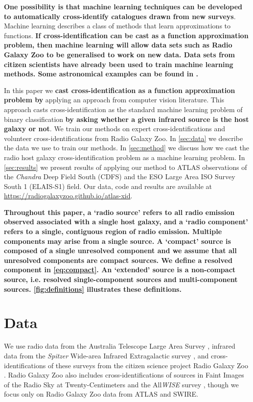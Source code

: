 \documentclass[fleqn,usenatbib,usedcolumn]{mnras}
\newcommand{\edited}[1]{{\bf {#1}}}
\begin{document}
  \edited{One possibility is that machine learning techniques can
  be developed to automatically cross-identify catalogues drawn from new surveys}. Machine learning
  describes a class of methods that learn approximations to functions. \edited{If
  cross-identification can be cast as a function approximation problem, then machine learning will allow data
  sets such as Radio Galaxy Zoo to be generalised to work on new data. Data sets from
  citizen scientists have already been used to train machine learning methods.
  Some astronomical examples can be found in \citet{marshall15citizenscience}.}

  In this paper we \edited{cast cross-identification as a function
  approximation problem by} applying an approach from computer vision
  literature. This approach casts cross-identification as the standard machine
  learning problem of binary classification \edited{by asking whether a given
  infrared source is the host galaxy or not}. We train our methods on expert
  cross-identifications and volunteer cross-identifications from Radio Galaxy Zoo. In
  \autoref{sec:data} we describe the data we use to train our methods. In
  \autoref{sec:method} we discuss how we cast the radio host galaxy
  cross-identification problem as a machine learning problem. In
  \autoref{sec:results} we present results of applying our method to ATLAS
  observations of the \emph{Chandra} Deep Field South (CDFS) and the ESO Large Area ISO Survey South 1 (ELAIS-S1) field. Our data, code and results are
  available at \url{https://radiogalaxyzoo.github.io/atlas-xid}.

  \edited{Throughout this paper, a `radio source' refers to all radio emission observed associated with a single host galaxy, and a `radio component' refers to a single, contiguous
  region of radio emission. Multiple components may arise from a single
  source. A `compact' source is composed of a \edited{single unresolved component} and we
  assume that all unresolved components are compact sources. \edited{We define a resolved component in \autoref{eq:compact}.} An `extended'
  source is a non-compact source, i.e. resolved single-component sources and
  multi-component sources. \autoref{fig:definitions} illustrates these definitions.}

\section{Data}\label{sec:data}

  We use radio data from the Australia Telescope Large Area Survey
  \citep[ATLAS;][]{norris06,franzen15}, infrared data from the \emph{Spitzer}
  Wide-area Infrared Extragalactic survey \citep[SWIRE;][]{lonsdale03swire,
  surace05swire}, and cross-identifications of these surveys from the citizen
  science project Radio Galaxy Zoo \citep{banfield15}. Radio Galaxy Zoo also
  includes cross-identifications of sources in Faint Images of the Radio Sky at
  Twenty-Centimeters \citep[FIRST;][]{white97first} and the All\emph{WISE}
  survey \citep{cutri2013wiseexplanatory}, though we focus only on Radio
  Galaxy Zoo data from ATLAS and SWIRE.
\end{document}
